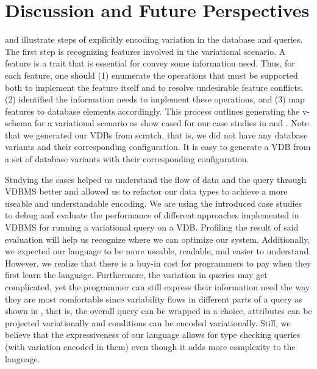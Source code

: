 \section{Discussion and Future Perspectives}
\label{sec:dis}

%
%
%
%
 and  illustrate steps of explicitly encoding
variation in the database and queries. The first step 
is recognizing features involved in the variational scenario. 
A feature is a trait that is essential for convey some information
need. 
%
Thus, for each feature, one should (1) enumerate the operations that must be supported both
to implement the feature itself and to resolve undesirable feature
conflicts, (2) identified the information needs to implement these
operations, and (3) map features to database elements accordingly.
%
This process outlines generating the v-schema for a variational
scenario as show cased for our case studies in 
 and .
%
Note that we generated our VDBs from scratch, that is,
we did not have any database variants and their corresponding
configuration. It is easy to generate a VDB from a set of 
database variants with their corresponding configuration.

Studying the cases helped us understand the flow of
data and the query through VDBMS better and allowed us to refactor
our data types to achieve a more useable and understandable encoding. 
%
We are using the introduced case studies to debug and evaluate the
performance of different approaches implemented in VDBMS 
for running a variational query on a VDB. Profiling the result
of said evaluation will help us recognize where we can optimize
our system. 
%
Additionally, we expected our language to be more useable, readable, and
easier to understand. However, we realize that there is a buy-in cost
for programmers to pay when they first learn the language. Furthermore,
the variation in queries may get complicated, yet the programmer can 
still express their information need the way they are most comfortable
since variability flows in different parts of a query as shown in , 
that is, the overall query
can be wrapped in a choice, attributes can be projected variationally and
conditions can be encoded variationally. 
Still, we believe that the expressiveness of our
language allows for type checking queries (with variation encoded in them)
even though it adds more complexity 
to the language.

